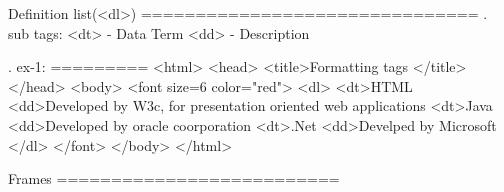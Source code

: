 Definition list(<dl>)
===============================
. sub tags: <dt> - Data Term 
	    <dd> - Description

. ex-1:
=========
<html>
  <head>
    <title>Formatting tags </title>
  </head>
  <body>
    <font size=6 color="red">
	  <dl>
	    <dt>HTML
		<dd>Developed by W3c, for presentation oriented web applications
		<dt>Java
		<dd>Developed by oracle coorporation
		<dt>.Net
		<dd>Develped by Microsoft
	  </dl>
	</font>
  </body>
</html>

Frames
==========================